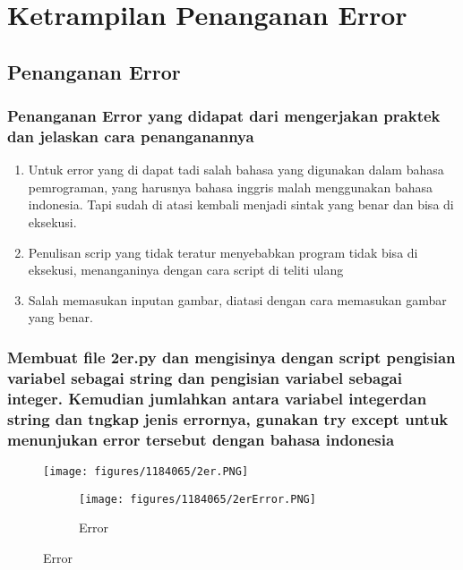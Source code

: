 \section{Ketrampilan Penanganan Error}
\subsection{Penanganan Error}
\subsubsection{Penanganan Error yang didapat dari mengerjakan praktek dan jelaskan cara penanganannya}
\begin{enumerate}
\item Untuk error yang di dapat tadi salah bahasa yang digunakan dalam bahasa pemrograman, yang harusnya bahasa inggris malah menggunakan bahasa indonesia. Tapi sudah di atasi kembali menjadi sintak yang benar dan bisa di eksekusi.
\item Penulisan scrip yang tidak teratur menyebabkan program tidak bisa di eksekusi, menanganinya dengan cara script di teliti ulang
\item Salah memasukan inputan gambar, diatasi dengan cara memasukan gambar yang benar.
\end{enumerate}
\subsubsection{Membuat file 2er.py dan mengisinya dengan script pengisian variabel sebagai string dan pengisian variabel sebagai integer. Kemudian jumlahkan antara variabel integerdan string dan tngkap jenis errornya, gunakan try except untuk menunjukan error tersebut dengan bahasa indonesia}
\begin{figure}[H]
		\texttt{[image: figures/1184065/2er.PNG]}
		\centering
		\caption{Kodingan Variabel sebagai string dan variabel sebagai integer }
		\begin{figure}[H]
		\texttt{[image: figures/1184065/2erError.PNG]}
		\centering
		\caption{Error}
\end{figure}
\end{figure}


